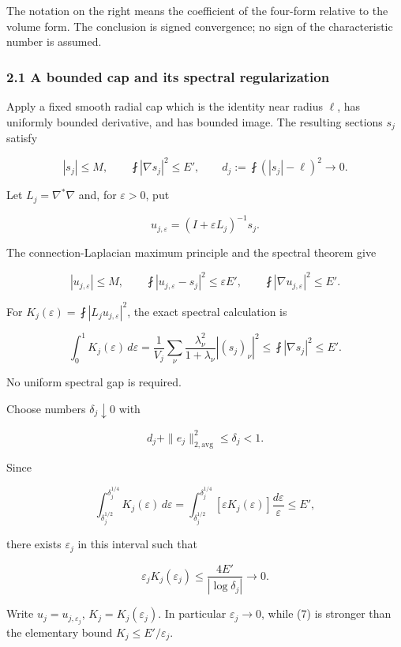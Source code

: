 \documentclass[11pt]{article}
\begin{document}
The notation on the right means the coefficient of the four-form
relative to the volume form. The conclusion is signed convergence; no
sign of the characteristic number is assumed.

\hypertarget{a-bounded-cap-and-its-spectral-regularization}{%
\subsubsection{2.1 A bounded cap and its spectral
regularization}\label{a-bounded-cap-and-its-spectral-regularization}}

Apply a fixed smooth radial cap which is the identity near radius
\(\ell\), has uniformly bounded derivative, and has bounded image. The
resulting sections \(s_j\) satisfy

\[
 |s_j|\le M,\qquad \fint|\nabla s_j|^2\le E',
 \qquad d_j:=\fint(|s_j|-\ell)^2\to0.
\tag{4}
\]

Let \(L_j=\nabla^*\nabla\) and, for \(\varepsilon>0\), put

\[
 u_{j,\varepsilon}=(I+\varepsilon L_j)^{-1}s_j.
\]

The connection-Laplacian maximum principle and the spectral theorem give

\[
 |u_{j,\varepsilon}|\le M,\qquad
 \fint|u_{j,\varepsilon}-s_j|^2\le\varepsilon E',
 \qquad \fint|\nabla u_{j,\varepsilon}|^2\le E'.
\tag{5}
\]

For \(K_j(\varepsilon)=\fint|L_j u_{j,\varepsilon}|^2\), the exact
spectral calculation is

\[
 \int_0^1K_j(\varepsilon)\,d\varepsilon
 =\frac1{V_j}\sum_\nu
 \frac{\lambda_\nu^2}{1+\lambda_\nu}|(s_j)_\nu|^2
 \le\fint|\nabla s_j|^2\le E'.
\tag{6}
\]

No uniform spectral gap is required.

Choose numbers \(\delta_j\downarrow0\) with

\[
 d_j+\|e_j\|_{2,\mathrm{avg}}^2\le\delta_j<1.
\]

Since

\[
 \int_{\delta_j^{1/2}}^{\delta_j^{1/4}}
 K_j(\varepsilon)\,d\varepsilon
 =\int_{\delta_j^{1/2}}^{\delta_j^{1/4}}
 [\varepsilon K_j(\varepsilon)]\frac{d\varepsilon}{\varepsilon}
 \le E',
\]

there exists \(\varepsilon_j\) in this interval such that

\[
 \boxed{\varepsilon_jK_j(\varepsilon_j)
 \le\frac{4E'}{|\log\delta_j|}\longrightarrow0.}
\tag{7}
\]

Write \(u_j=u_{j,\varepsilon_j}\), \(K_j=K_j(\varepsilon_j)\). In
particular \(\varepsilon_j\to0\), while (7) is stronger than the
elementary bound \(K_j\le E'/\varepsilon_j\).
\end{document}
